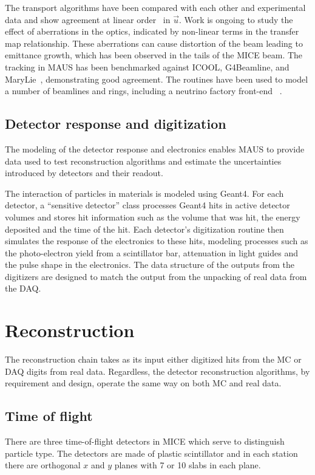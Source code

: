 \documentclass[11pt,a4paper]{article}
\begin{document}
The transport algorithms have been compared with each other and experimental data and show agreement at linear order~\cite{MiddletonThesis} in $\vec{u}$. Work is ongoing to study the effect of aberrations in the optics, indicated by non-linear terms in the transfer map relationship. These aberrations can cause distortion of the beam leading to emittance growth, which has been observed in the tails of the MICE beam. The tracking in MAUS has been benchmarked against ICOOL, G4Beamline, and MaryLie~\cite{MaryLie}, demonstrating good agreement. The routines have been used to model a number of beamlines and rings, including a neutrino factory front-end ~\cite{MAUSNuFact}.

\subsection{Detector response and digitization}\label{sec:detresp}
The modeling of the detector response and electronics enables MAUS to provide  data used to test reconstruction algorithms and estimate the uncertainties introduced by detectors and their readout.

The interaction of particles in materials is modeled using Geant4.  For each detector, a ``sensitive detector'' class processes Geant4 hits in active detector volumes and stores hit information such as the volume that was hit, the energy deposited and the time of the hit. Each detector's digitization routine then simulates the response of the electronics to these hits, modeling processes such as the photo-electron yield from a scintillator bar, attenuation in light guides and the pulse shape in the electronics. The data structure of the outputs from the digitizers are designed to match the output from the unpacking of real data from the DAQ.


\section{Reconstruction}\label{sec:recon}
The reconstruction chain takes as its input either digitized hits from the MC or DAQ digits from real data. Regardless, the detector reconstruction algorithms, by requirement and design, operate the same way on both MC and real data. 

\subsection{Time of flight}

There are three time-of-flight detectors in MICE which serve to distinguish particle type. The detectors are made of plastic scintillator and in each station there are orthogonal $x$ and $y$ planes with 7 or 10 slabs in each plane. 
\end{document}
